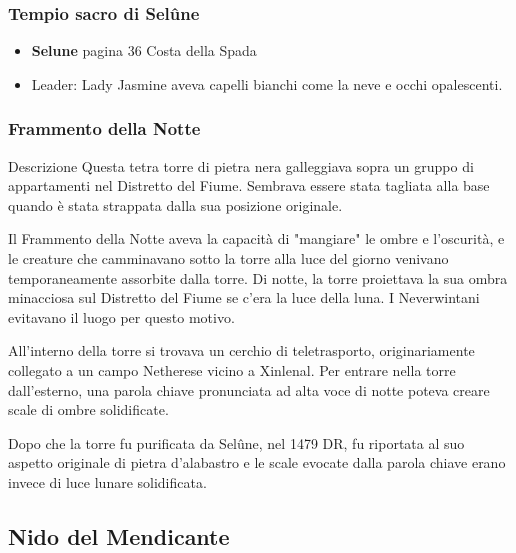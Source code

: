 \documentclass{article}
\begin{document}
\subsubsection{Tempio sacro di Selûne}
\begin{itemize}
    \item \textbf{Selune} pagina 36 Costa della Spada
    \item Leader: Lady Jasmine aveva capelli bianchi come la neve e occhi opalescenti.
\end{itemize}
\subsubsection{Frammento della Notte}
Descrizione\newline
Questa tetra torre di pietra nera galleggiava sopra un gruppo di appartamenti nel Distretto del Fiume. Sembrava essere stata tagliata alla base quando è stata strappata dalla sua posizione originale.

Il Frammento della Notte aveva la capacità di "mangiare" le ombre e l'oscurità, e le creature che camminavano sotto la torre alla luce del giorno venivano temporaneamente assorbite dalla torre. Di notte, la torre proiettava la sua ombra minacciosa sul Distretto del Fiume se c'era la luce della luna. I Neverwintani evitavano il luogo per questo motivo.

All'interno della torre si trovava un cerchio di teletrasporto, originariamente collegato a un campo Netherese vicino a Xinlenal. Per entrare nella torre dall'esterno, una parola chiave pronunciata ad alta voce di notte poteva creare scale di ombre solidificate.

Dopo che la torre fu purificata da Selûne, nel 1479 DR, fu riportata al suo aspetto originale di pietra d'alabastro e le scale evocate dalla parola chiave erano invece di luce lunare solidificata.

\subsection{Nido del Mendicante}
\end{document}
